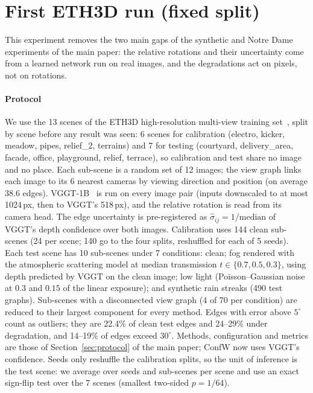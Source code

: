 

\section{First ETH3D run (fixed split)}\label{sec:eth3d1}
This experiment removes the two main gaps of the synthetic and Notre Dame experiments of the main paper: the relative rotations and their uncertainty come from a learned network run on real images, and the degradations act on pixels, not on rotations.

\paragraph{Protocol} We use the 13 scenes of the ETH3D high-resolution multi-view training set~\cite{schops2017eth3d}, split by scene before any result was seen: 6 scenes for calibration (electro, kicker, meadow, pipes, relief\_2, terrains) and 7 for testing (courtyard, delivery\_area, facade, office, playground, relief, terrace), so calibration and test share no image and no place. Each sub-scene is a random set of 12 images; the view graph links each image to its 6 nearest cameras by viewing direction and position (on average 38.6 edges). VGGT-1B~\cite{wang2025vggt} is run on every image pair (inputs downscaled to at most 1024\,px, then to VGGT's 518\,px), and the relative rotation is read from its camera head. The edge uncertainty is pre-registered as $\hat\sigma_{ij}=1/\mathrm{median}$ of VGGT's depth confidence over both images. Calibration uses 144 clean sub-scenes (24 per scene; 140 go to the four splits, reshuffled for each of 5 seeds). Each test scene has 10 sub-scenes under 7 conditions: clean; fog rendered with the atmospheric scattering model at median transmission $t\in\{0.7,0.5,0.3\}$, using depth predicted by VGGT on the clean image; low light (Poisson--Gaussian noise at $0.3$ and $0.15$ of the linear exposure); and synthetic rain streaks (490 test graphs). Sub-scenes with a disconnected view graph (4 of 70 per condition) are reduced to their largest component for every method. Edges with error above $5^\circ$ count as outliers; they are 22.4\% of clean test edges and 24--29\% under degradation, and 14--19\% of edges exceed $30^\circ$. Methods, configuration and metrics are those of Section~\ref{sec:protocol} of the main paper; ConfW now uses VGGT's confidence. Seeds only reshuffle the calibration splits, so the unit of inference is the test scene: we average over seeds and sub-scenes per scene and use an exact sign-flip test over the 7 scenes (smallest two-sided $p=1/64$).

